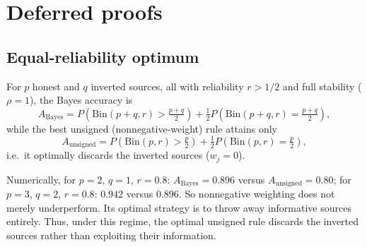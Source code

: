 \appendix
\section{Deferred proofs}
\label{app:deferred-proofs}



\subsection{Equal-reliability optimum}

\begin{lemma}
\label{lem:equalrel}
For $p$ honest and $q$ inverted sources, all with reliability $r > 1/2$
and full stability ($\rho = 1$), the Bayes accuracy is
\[
A_{\mathrm{Bayes}} = P\!\left(\mathrm{Bin}(p+q, r) > \tfrac{p+q}{2}\right)
+ \tfrac{1}{2}P\!\left(\mathrm{Bin}(p+q, r) = \tfrac{p+q}{2}\right),
\]
while the best unsigned (nonnegative-weight) rule attains only
\[
A_{\mathrm{unsigned}} = P\!\left(\mathrm{Bin}(p, r) > \tfrac{p}{2}\right)
+ \tfrac{1}{2}P\!\left(\mathrm{Bin}(p, r) = \tfrac{p}{2}\right),
\]
i.e.\ it optimally discards the inverted sources ($w_j = 0$).
\end{lemma}



Numerically, for $p=2$, $q=1$, $r=0.8$:
$A_{\mathrm{Bayes}} = 0.896$ versus $A_{\mathrm{unsigned}} = 0.80$; for
$p=3$, $q=2$, $r=0.8$: $0.942$ versus $0.896$. So nonnegative weighting
does not merely underperform. Its optimal strategy is to throw away
informative sources entirely. Thus, under this regime, the optimal
unsigned rule discards the inverted sources rather than exploiting their
information.

